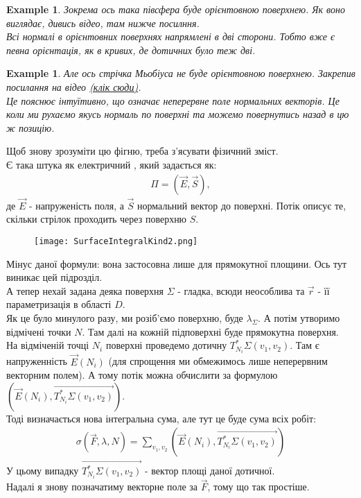 \documentclass[a4paper, 10pt]{article}
\theoremstyle{theoremdd}
\theoremstyle{theoremdd}
\theoremstyle{theoremdd}
\theoremstyle{theoremdd}
\theoremstyle{theoremdd}
\newtheorem{example}[theorem]{Example}
\theoremstyle{theoremdd}
\theoremstyle{theoremdd}
\theoremstyle{theoremdd}
\theoremstyle{theoremdd}
\theoremstyle{theoremdd}
\theoremstyle{theoremdd}
\theoremstyle{theoremdd}
\theoremstyle{theoremdd}
\theoremstyle{theoremdd}
\theoremstyle{theoremdd}
\begin{document}
\begin{example}
Зокрема ось така півсфера буде орієнтовною поверхнею. Як воно виглядає, дивись відео, там нижче посилння.\\
Всі нормалі в орієнтовних поверхнях напрямлені в дві сторони. Тобто вже є певна орієнтація, як в кривих, де дотичних було теж дві.
\end{example}

\begin{example}
Але ось стрічка Мьобіуса не буде орієнтовною поверхнею. Закрепив посилання на відео \href{https://www.youtube.com/watch?v=S48JsV-pCBo}{(клік сюди)}.\\
Це пояснює інтуїтивно, що означає неперервне поле нормальних векторів. Це коли ми рухаємо якусь нормаль по поверхні та можемо повернутись назад в цю ж позицію.
\end{example}

Щоб знову зрозуміти цю фігню, треба з'ясувати фізичний зміст.\\
Є така штука як електричний , який задається як:
\begin{align*}
\Pi = (\vec{E}, \vec{S}),
\end{align*}
де $\vec{E}$ - напруженість поля, а $\vec{S}$ нормальний вектор до поверхні. Потік описує те, скільки стрілок проходить через поверхню $S$.
\begin{figure}[H]
\centering
\texttt{[image: SurfaceIntegralKind2.png]}
\end{figure}
Мінус даної формули: вона застосовна лише для прямокутної площини. Ось тут виникає цей підрозділ.\\
А тепер нехай задана деяка поверхня $\Sigma$ - гладка, всюди неособлива та $\vec{r}$ - її параметризація в області $D$.\\
Як це було минулого разу, ми розіб'ємо поверхню, буде $\lambda_\Sigma$. А потім утворимо відмічені точки $N$. Там далі на кожній підповерхні буде прямокутна поверхня.\\
На відміченій точці $N_i$ поверхні проведемо дотичну $T^*_{N_i} \Sigma(v_1,v_2)$. Там є напруженність $\vec{E}(N_i)$ (для спрощення ми обмежимось лише неперервним векторним полем). А тому потік можна обчислити за формулою $( \vec{E}(N_i), \overrightarrow{T^*_{N_i} \Sigma(v_1,v_2)} )$.\\
Тоді визначається нова інтегральна сума, але тут це буде сума всіх робіт:
\begin{align*}
\sigma(\vec{F},\lambda,N) = \displaystyle\sum_{v_1,v_2} \left( \vec{E}(N_i), \overrightarrow{T^*_{N_i} \Sigma(v_1,v_2)} \right)
\end{align*}
У цьому випадку $\overrightarrow{T^*_{N_i} \Sigma(v_1,v_2)}$ - вектор площі даної дотичної.\\
Надалі я знову позначатиму векторне поле за $\vec{F}$, тому що так простіше.
\end{document}
